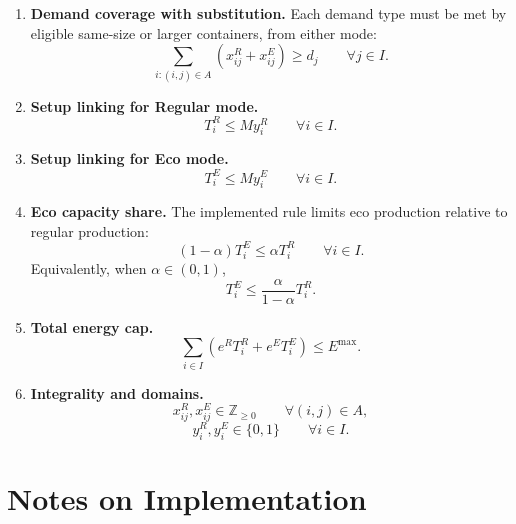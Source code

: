\begin{enumerate}
\item \textbf{Demand coverage with substitution.}  
Each demand type must be met by eligible same-size or larger containers, from either mode:
\[
\sum_{i:(i,j)\in A}\left(x^R_{ij}+x^E_{ij}\right)\ge d_j
\qquad \forall j\in I.
\]

\item \textbf{Setup linking for Regular mode.}
\[
T^R_i \le M y^R_i
\qquad \forall i\in I.
\]

\item \textbf{Setup linking for Eco mode.}
\[
T^E_i \le M y^E_i
\qquad \forall i\in I.
\]

\item \textbf{Eco capacity share.}  
The implemented rule limits eco production relative to regular production:
\[
(1-\alpha)T^E_i \le \alpha T^R_i
\qquad \forall i\in I.
\]
Equivalently, when $\alpha \in (0,1)$,
\[
T^E_i \le \frac{\alpha}{1-\alpha} T^R_i.
\]

\item \textbf{Total energy cap.}
\[
\sum_{i\in I}\left(e^R T^R_i + e^E T^E_i\right)\le E^{\max}.
\]

\item \textbf{Integrality and domains.}
\[
x^R_{ij},x^E_{ij}\in \mathbb{Z}_{\ge 0}
\qquad \forall (i,j)\in A,
\]
\[
y^R_i,y^E_i\in \{0,1\}
\qquad \forall i\in I.
\]
\end{enumerate}

\section*{Notes on Implementation}

